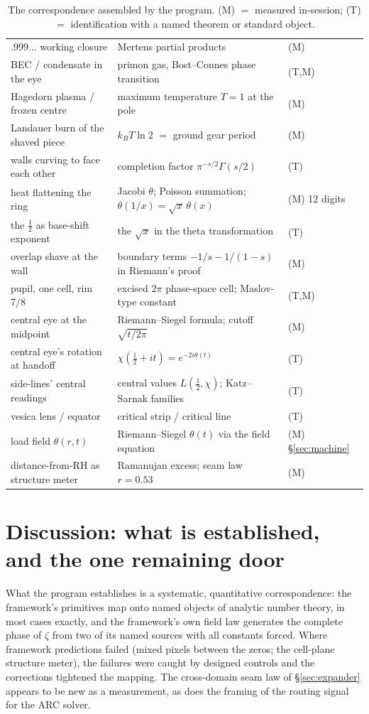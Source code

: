 \documentclass[11pt]{article}
\begin{document}
\begin{table}[t]
\begin{tabular}{@{}lll@{}}
$.999\ldots$ working closure & Mertens partial products & (M)\\
BEC / condensate in the eye & primon gas, Bost--Connes phase transition & (T,M)\\
Hagedorn plasma / frozen centre & maximum temperature $T=1$ at the pole & (M)\\
Landauer burn of the shaved piece & $k_BT\ln2$ $=$ ground gear period & (M)\\
walls curving to face each other & completion factor $\pi^{-s/2}\Gamma(s/2)$ & (T)\\
heat flattening the ring & Jacobi $\theta$; Poisson summation; $\theta(1/x)=\sqrt x\,\theta(x)$ & (M) 12 digits\\
the $\tfrac12$ as base-shift exponent & the $\sqrt x$ in the theta transformation & (T)\\
overlap shave at the wall & boundary terms $-1/s-1/(1-s)$ in Riemann's proof & (M)\\
pupil, one cell, rim $7/8$ & excised $2\pi$ phase-space cell; Maslov-type constant & (T,M)\\
central eye at the midpoint & Riemann--Siegel formula; cutoff $\sqrt{t/2\pi}$ & (M)\\
central eye's rotation at handoff & $\chi(\tfrac12+it)=e^{-2i\theta(t)}$ & (T)\\
side-lines' central readings & central values $L(\tfrac12,\chi)$; Katz--Sarnak families & (T)\\
vesica lens / equator & critical strip / critical line & (T)\\
load field $\theta(r,t)$ & Riemann--Siegel $\theta(t)$ via the field equation & (M) \S\ref{sec:machine}\\
distance-from-RH as structure meter & Ramanujan excess; seam law $r=0.53$ & (M)\\
\bottomrule
\end{tabular}
\caption{The correspondence assembled by the program. (M) $=$ measured in-session;
(T) $=$ identification with a named theorem or standard object.}
\label{tab:corr}
\end{table}

\section{Discussion: what is established, and the one remaining door}\label{sec:discussion}

What the program establishes is a systematic, quantitative correspondence: the framework's
primitives map onto named objects of analytic number theory, in most cases exactly, and the
framework's own field law generates the complete phase of $\zeta$ from two of its named sources with
all constants forced. Where framework predictions failed (mixed pixels between the zeros; the
cell-plane structure meter), the failures were caught by designed controls and the corrections
tightened the mapping. The cross-domain seam law of \S\ref{sec:expander} appears to be new as a
measurement, as does the framing of the routing signal for the ARC solver.
\end{document}
